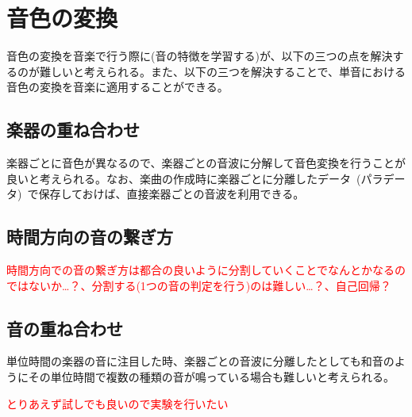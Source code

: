 \section{音色の変換}


音色の変換を音楽で行う際に(音の特徴を学習する)が、以下の三つの点を解決するのが難しいと考えられる。また、以下の三つを解決することで、単音における音色の変換を音楽に適用することができる。

\subsection{楽器の重ね合わせ}

楽器ごとに音色が異なるので、楽器ごとの音波に分解して音色変換を行うことが良いと考えられる。なお、楽曲の作成時に楽器ごとに分離したデータ~(パラデータ)~で保存しておけば、直接楽器ごとの音波を利用できる。


\subsection{時間方向の音の繋ぎ方}

\textcolor{red}{時間方向での音の繋ぎ方は都合の良いように分割していくことでなんとかなるのではないか…？、分割する(1つの音の判定を行う)のは難しい…？、自己回帰？}

\subsection{音の重ね合わせ}

単位時間の楽器の音に注目した時、楽器ごとの音波に分離したとしても和音のようにその単位時間で複数の種類の音が鳴っている場合も難しいと考えられる。

\textcolor{red}{とりあえず試しでも良いので実験を行いたい}